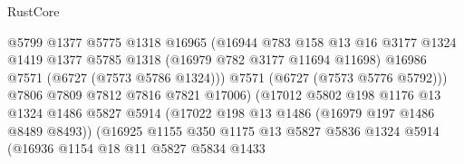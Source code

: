 \begin{lexlean}{RustCore}
\begin{coremodule}
                                        @5799
                                        @1377
                                        @5775
                                        @1318
                                        @16965
                                        (@16944
                                          @783
                                          @158
                                          @13
                                          @16
                                          @3177
                                          @1324
                                          @1419
                                          @1377
                                          @5785
                                          @1318
                                          (@16979 @782 @3177 @11694 @11698)
                                          @16986
                                          @7571
                                          (@6727 (@7573 @5786 @1324)))
                                        @7571
                                        (@6727 (@7573 @5776 @5792)))
                                      @7806
                                      @7809
                                      @7812
                                      @7816
                                      @7821
                                      @17006)
                                    (@17012
                                      @5802
                                      @198
                                      @1176
                                      @13
                                      @1324
                                      @1486
                                      @5827
                                      @5914
                                      (@17022 @198 @13 @1486 (@16979 @197 @1486 @8489 @8493))
                                      (@16925
                                        @1155
                                        @350
                                        @1175
                                        @13
                                        @5827
                                        @5836
                                        @1324
                                        @5914
                                        (@16936
                                          @1154
                                          @18
                                          @11
                                          @5827
                                          @5834
                                          @1433

\end{coremodule}
\end{lexlean}
